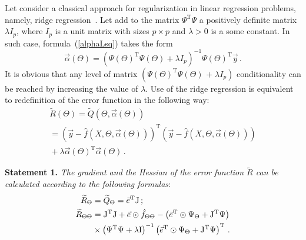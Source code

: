 \begin{multicols}{2}
Let consider a classical approach for regularization in linear regression 
problems, namely,  ridge regression~\cite{demidenko}.
Let add to the matrix $\Psi^{\mathrm{T}}\Psi$ a positively definite matrix $\lambda I_p$, 
where
 $I_p$ is a unit matrix with sizes $p\times p$ and $\lambda > 0$ is a some constant.
In such case, formula~(\ref{alphaLsq}) takes the form
\begin{equation}
\label{alphaRidge}
\vec\alpha \left( \Theta \right) =
 \left( \Psi\left( \Theta \right)^{\mathrm{T}} \Psi\left( \Theta \right) + 
 \lambda I_p\right)^{-1}
 \Psi\left( \Theta \right)^{\mathrm{T}} \vec y\,.
\end{equation}
It is obvious that any level of matrix 
  $\left( \Psi\left( \Theta \right)^{\mathrm{T}} \Psi\left( \Theta \right)\right.$\linebreak 
  $ \left.+\;\lambda I_p\right)$ 
  conditionality can be reached by increasing the value of $\lambda$.
Use of the ridge regression is equivalent to redefinition of the 
error function in the following way:
\begin{multline*}
  \widetilde R\left( \Theta \right) = 
  \widetilde Q\left( \Theta, \vec \alpha\left(\Theta\right) \right)\\ =
  \left( \vec y - \hat f \left( X, \Theta, \vec\alpha\left(\Theta\right) \right) \right)^{\mathrm{T}}
  \left( \vec y - \hat f \left( X, \Theta, \vec\alpha\left(\Theta\right) \right) \right)\\
{}  + \lambda \vec \alpha\left(\Theta\right)^{\mathrm{T}} \vec \alpha\left(\Theta\right)\,.
\end{multline*}

\noindent
\textbf{Statement 1.} %
\textit{The gradient and the Hessian of the error function
 $\widetilde R$ can be calculated according to the following formulas}:
  \begin{align}
  \widetilde R_\Theta &= \widetilde Q_\Theta = \vec e^{\mathrm{T}} \mathrm{J}\,;\notag\\ 
    \widetilde R_{\Theta\Theta} &=  
      \mathrm{J}^{\mathrm{T}}\mathrm{J} + \vec e \odot \hat f_{\Theta \Theta}-
      \left({\vec e}^{\mathrm{T}} \odot \Psi_\Theta + \mathrm{J}^{\mathrm{T}}  \Psi\right)\notag\\
      &{}\times  \left( \Psi^{\mathrm{T}} \Psi  + \lambda \mathrm{I} \right)^{-1}
      \left({\vec e}^{\mathrm{T}} \odot \Psi_\Theta + \mathrm{J}^{\mathrm{T}}  
      \Psi\right)^{\mathrm{T}}\,.    \label{rHessBeforeNls}
  \end{align}


\end{multicols}
